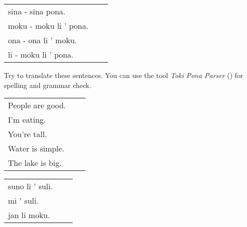 \begin{supertabular}{p{5,5cm}|ll}
sina - sina pona. &&  \\ %
moku - moku li ' pona. &&  \\ %
ona - ona li ' moku. &&  \\ %
li - moku li ' pona. &&  \\ %
\end{supertabular}

Try to translate these sentences. 
You can use the tool \textit{Toki Pona Parser} (\cite{www:rowa:02}) for spelling and grammar check. 

\begin{supertabular}{p{5,5cm}|ll}
People are good. && \\ %
I'm eating. &&  \\ %
You're tall. &&  \\ %
Water is simple. &&  \\ %
The lake is big. &&\\ %
\end{supertabular}

\begin{supertabular}{p{5,5cm}|ll}
suno li ' suli. &&  \\%
mi ' suli. &&  \\%
jan li moku. &&  \\%
\end{supertabular} \\%
%
